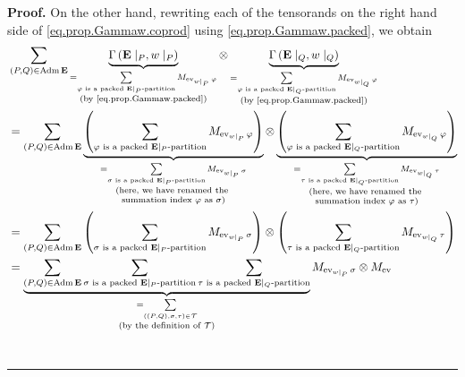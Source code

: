 \documentclass[numbers=enddot,12pt,final,onecolumn,notitlepage,abstracton]{scrartcl}
\theoremstyle{definition}
\newenvironment{proof}[1][Proof]{\noindent\textbf{#1.} }{\ \rule{0.5em}{0.5em}}
\let\sumnonlimits\sum
\renewcommand{\sum}{\sumnonlimits\limits}
\newenvironment{verlong}{}{}
\newcommand{\Adm}{\operatorname{Adm}}
\newcommand{\EE}{{\mathbf{E}}}
\begin{document}
\begin{verlong}
\begin{proof}
On the other hand, rewriting each of the tensorands on the right hand side of
\eqref{eq.prop.Gammaw.coprod} using \eqref{eq.prop.Gammaw.packed}, we obtain
\begin{align*}
&  \sum_{\left(  P,Q\right)  \in \Adm \EE }%
\underbrace{\Gamma\left(   \EE \mid_{P},w\mid_{P}\right)
}_{\substack{=\sum_{\varphi\text{ is a packed } \EE \mid_{P}%
\text{-partition}}M_{\operatorname{ev}_{w\mid_{P}}\varphi}\\\text{(by
\eqref{eq.prop.Gammaw.packed})}}}\otimes\underbrace{\Gamma\left(
\EE\mid_{Q},w\mid_{Q}\right)  }_{\substack{=\sum_{\varphi
\text{ is a packed } \EE \mid_{Q}\text{-partition}}
M_{\operatorname{ev}_{w\mid_{Q}} \varphi} \\
\text{(by \eqref{eq.prop.Gammaw.packed})}}}\\
&  =\sum_{\left(  P,Q\right)  \in \Adm \EE}
\underbrace{ \left(
 \sum_{\varphi\text{ is a packed } \EE \mid_{P}\text{-partition}%
  }M_{\operatorname{ev}_{w\mid_{P}}\varphi}\right)}
  _{\substack{
    = \sum_{\sigma\text{ is a packed } \EE \mid_{P}\text{-partition}%
    }M_{\operatorname{ev}_{w\mid_{P}}\sigma} \\
    \text{(here, we have renamed the } \\
    \text{summation index } \varphi \text{ as } \sigma \text{)}
    }}
\otimes
\underbrace{ \left(
 \sum_{\varphi\text{ is a packed } \EE \mid_{Q}\text{-partition}%
  }M_{\operatorname{ev}_{w\mid_{Q}}\varphi}\right)}
   _{\substack{
     = \sum_{\tau\text{ is a packed } \EE \mid_{Q}\text{-partition}}%
     M_{\operatorname{ev}_{w\mid_{Q}}\tau} \\
    \text{(here, we have renamed the } \\
    \text{summation index } \varphi \text{ as } \tau \text{)}
    }}
\\
&  =\sum_{\left(  P,Q\right)  \in \Adm \EE }\left(
\sum_{\sigma\text{ is a packed } \EE \mid_{P}\text{-partition}%
}M_{\operatorname{ev}_{w\mid_{P}}\sigma}\right)  \otimes\left(  \sum
_{\tau\text{ is a packed } \EE \mid_{Q}\text{-partition}}%
M_{\operatorname{ev}_{w\mid_{Q}}\tau}\right)  \\
&  =\underbrace{\sum_{\left(  P,Q\right)  \in \Adm \EE %
}\sum_{\sigma\text{ is a packed } \EE \mid_{P}\text{-partition}}%
\sum_{\tau\text{ is a packed } \EE \mid_{Q}\text{-partition}}%
}_{\substack{=\sum_{\left(  \left(  P,Q\right)  ,\sigma,\tau\right)
\in\mathcal{T}}\\\text{(by the definition of }\mathcal{T}\text{)}%
}}M_{\operatorname{ev}_{w\mid_{P}}\sigma}\otimes M_{\operatorname{ev}%
}
\end{align*}
\end{proof}
\end{verlong}
\end{document}
